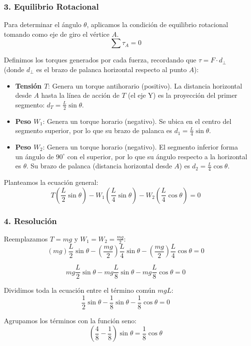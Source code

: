 \documentclass[12pt, a4paper]{article}
\begin{document}
\subsubsection*{3. Equilibrio Rotacional}
Para determinar el ángulo $\theta$, aplicamos la condición de equilibrio rotacional tomando como eje de giro el vértice $A$.
$$\sum \tau_A = 0$$

Definimos los torques generados por cada fuerza, recordando que $\tau = F \cdot d_{\perp}$ (donde $d_{\perp}$ es el brazo de palanca horizontal respecto al punto $A$):

\begin{itemize}
    \item \textbf{Tensión $T$}: Genera un torque antihorario (positivo). La distancia horizontal desde $A$ hasta la línea de acción de $T$ (el eje Y) es la proyección del primer segmento: $d_T = \frac{L}{2} \sin\theta$.
    \item \textbf{Peso $W_1$}: Genera un torque horario (negativo). Se ubica en el centro del segmento superior, por lo que su brazo de palanca es $d_1 = \frac{L}{4} \sin\theta$.
    \item \textbf{Peso $W_2$}: Genera un torque horario (negativo). El segmento inferior forma un ángulo de $90^\circ$ con el superior, por lo que su ángulo respecto a la horizontal es $\theta$. Su brazo de palanca (distancia horizontal desde $A$) es $d_2 = \frac{L}{4} \cos\theta$.
\end{itemize}

Planteamos la ecuación general:
$$T \left( \frac{L}{2} \sin\theta \right) - W_1 \left( \frac{L}{4} \sin\theta \right) - W_2 \left( \frac{L}{4} \cos\theta \right) = 0$$

\subsubsection*{4. Resolución}
Reemplazamos $T = mg$ y $W_1 = W_2 = \frac{mg}{2}$:
$$(mg) \frac{L}{2} \sin\theta - \left( \frac{mg}{2} \right) \frac{L}{4} \sin\theta - \left( \frac{mg}{2} \right) \frac{L}{4} \cos\theta = 0$$

$$mg \frac{L}{2} \sin\theta - mg \frac{L}{8} \sin\theta - mg \frac{L}{8} \cos\theta = 0$$

Dividimos toda la ecuación entre el término común $mgL$:
$$\frac{1}{2} \sin\theta - \frac{1}{8} \sin\theta - \frac{1}{8} \cos\theta = 0$$

Agrupamos los términos con la función seno:
$$\left( \frac{4}{8} - \frac{1}{8} \right) \sin\theta = \frac{1}{8} \cos\theta$$
\end{document}
